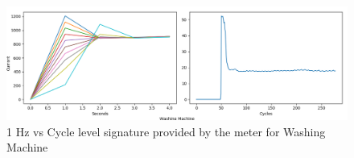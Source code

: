 \begin{figure} 
	\centering
	\includegraphics[width=1\linewidth]{images/H23WashingMachine}
	\caption[1 Hz vs Cycle level signature provided by the meter for Washing Machine]{1 Hz vs Cycle level signature provided by the meter for Washing Machine}
	\label{fig:H23WashingMachine}
\end{figure}
